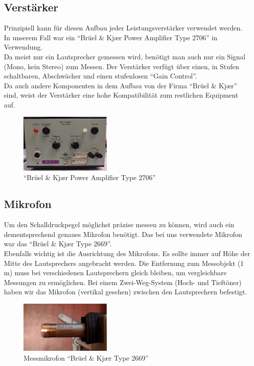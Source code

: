 \newpage
\subsection*{Verstärker}\label{subsec:4.1.3}
Prinzipiell kann für diesen Aufbau jeder Leistungsverstärker verwendet werden.
In unserem Fall war ein \enquote{Brüel \& Kj\ae r Power Amplifier Type 2706} in Verwendung.
\\
Da meist nur ein Lautsprecher gemessen wird, benötigt man auch nur ein Signal (Mono, kein Stereo) zum Messen.
Der Verstärker verfügt über einen, in Stufen schaltbaren, Abschwächer und einen stufenlosen \enquote{Gain Control}.\\
Da auch andere Komponenten in dem Aufbau von der Firma  \enquote{Brüel \& Kj\ae r} sind, weist der Verstärker eine hohe Kompatibilität zum restlichen Equipment auf.
\begin{figure} [H]
	\centering
	\includegraphics[width=0.4\textwidth]{img/LSMessung/verstaerker1.png}
	\caption{\enquote{Brüel \& Kj\ae r Power Amplifier Type 2706}}
	\label{fig:4.1.3.1}
\end{figure}

\subsection*{Mikrofon}\label{subsec:4.1.4}
Um den Schalldruckpegel möglichst präzise messen zu können, wird auch ein dementsprechend genaues Mikrofon benötigt.
Das bei uns verwendete Mikrofon war das \enquote{Brüel \& Kj\ae r Type 2669}.
\\
Ebenfalls wichtig ist die Ausrichtung des Mikrofons.
Es sollte immer auf Höhe der Mitte des Lautsprechers angebracht werden.
Die Entfernung zum Messobjekt (1 m) muss bei verschiedenen Lautsprechern gleich bleiben, um vergleichbare Messungen zu ermöglichen.
Bei einem Zwei-Weg-System (Hoch- und Tieftöner) haben wir das Mikrofon (vertikal gesehen) zwischen den Lautsprechern befestigt.
\begin{figure} [H]
	\centering
	\includegraphics[width=0.4\textwidth]{img/LSMessung/mikro.png}
	\caption{Messmikrofon \enquote{Brüel \& Kj\ae r Type 2669}}
	\label{fig:4.1.4.1}
\end{figure}